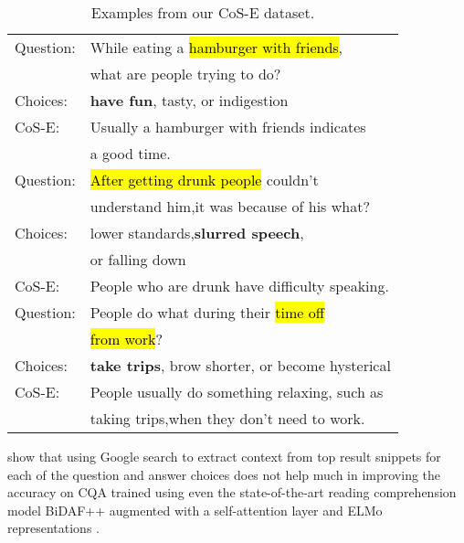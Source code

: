 \documentclass[11pt,a4paper]{article}
\begin{document}
\begin{table}[t]
\centering
\small
\begin{tabular}{ll}
\toprule
Question: &While eating a \hl{hamburger with friends},\\
&what are people trying to do?\\ 
Choices: &\textbf{have fun}, tasty, or indigestion \\
CoS-E: & Usually a hamburger with friends indicates \\
&a good time.\\
\midrule
Question: &\hl{After getting drunk people} couldn't \\
&understand him,it was because of his what?\\ 
Choices: &lower standards,\textbf{slurred speech}, \\
&or falling down\\
CoS-E: & People who are drunk have difficulty speaking.\\
\midrule
Question: &People do what during their \hl{time off} \\
&\hl{from work}?\\
Choices: &\textbf{take trips}, brow shorter, or become hysterical \\
CoS-E: & People usually do something relaxing, such as  \\
&taking trips,when they don't need to work.\\
\bottomrule
\end{tabular}
\caption{Examples from our CoS-E dataset.}
\vspace{-0.5cm}
\label{cose}
\end{table}
 
\citet{talmor2018commonsenseqa} show that using Google search to extract context from top  result snippets for each of the question and answer choices does not help much in improving the accuracy on CQA trained using even the state-of-the-art reading comprehension model BiDAF++ \citep{Seo2017BidirectionalAF} augmented with a self-attention layer and ELMo representations \citep{peters2018deep}. 
\end{document}
